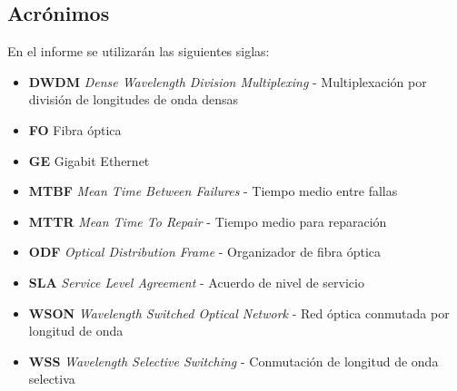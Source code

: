 \subsection{Acrónimos}
\label{sec:acronimos}

En el informe se utilizarán las siguientes siglas:
\begin{itemize}
\item \textbf{DWDM} \emph{Dense Wavelength Division Multiplexing} - Multiplexación por división de longitudes de onda densas
\item \textbf{FO} Fibra óptica
\item \textbf{GE} Gigabit Ethernet
\item \textbf{MTBF} \emph{Mean Time Between Failures} - Tiempo medio entre fallas
\item \textbf{MTTR} \emph{Mean Time To Repair} - Tiempo medio para reparación
\item \textbf{ODF} \emph{Optical Distribution Frame} - Organizador de fibra óptica
\item \textbf{SLA} \emph{Service Level Agreement} - Acuerdo de nivel de servicio
\item \textbf{WSON} \emph{Wavelength Switched Optical Network} - Red óptica conmutada por longitud de onda
\item \textbf{WSS} \emph{Wavelength Selective Switching} - Conmutación de longitud de onda selectiva
\end{itemize}
